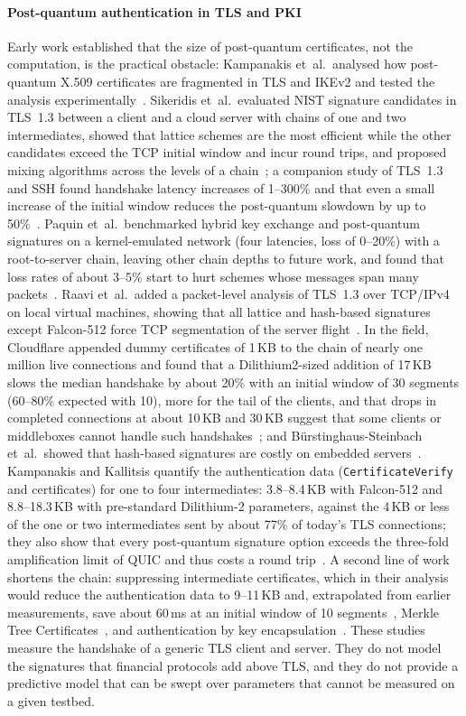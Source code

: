 \documentclass[preprint,12pt]{elsarticle}
\newcommand{\ms}{\,ms\xspace}
\newcommand{\KB}{\,KB\xspace}
\begin{document}
\paragraph{Post-quantum authentication in TLS and PKI} Early work established that the size of post-quantum certificates, not the computation, is the practical obstacle: Kampanakis et~al.\ analysed how post-quantum X.509 certificates are fragmented in TLS and IKEv2 and tested the analysis experimentally~\cite{kampanakis2018}. Sikeridis et~al.\ evaluated NIST signature candidates in TLS~1.3 between a client and a cloud server with chains of one and two intermediates, showed that lattice schemes are the most efficient while the other candidates exceed the TCP initial window and incur round trips, and proposed mixing algorithms across the levels of a chain~\cite{sikeridis2020}; a companion study of TLS~1.3 and SSH found handshake latency increases of 1--300\% and that even a small increase of the initial window reduces the post-quantum slowdown by up to 50\%~\cite{sikeridis2020b}. Paquin et~al.\ benchmarked hybrid key exchange and post-quantum signatures on a kernel-emulated network (four latencies, loss of 0--20\%) with a root-to-server chain, leaving other chain depths to future work, and found that loss rates of about 3--5\% start to hurt schemes whose messages span many packets~\cite{paquin2020}. Raavi et~al.\ added a packet-level analysis of TLS~1.3 over TCP/IPv4 on local virtual machines, showing that all lattice and hash-based signatures except Falcon-512 force TCP segmentation of the server flight~\cite{raavi2025}. In the field, Cloudflare appended dummy certificates of 1\KB to the chain of nearly one million live connections and found that a Dilithium2-sized addition of 17\KB slows the median handshake by about 20\% with an initial window of 30 segments (60--80\% expected with 10), more for the tail of the clients, and that drops in completed connections at about 10\KB and 30\KB suggest that some clients or middleboxes cannot handle such handshakes~\cite{westerbaan2021}; and Bürstinghaus-Steinbach et~al.\ showed that hash-based signatures are costly on embedded servers~\cite{burstinghaus2020}. Kampanakis and Kallitsis quantify the authentication data (\texttt{CertificateVerify} and certificates) for one to four intermediates: 3.8--8.4\KB with Falcon-512 and 8.8--18.3\KB with pre-standard Dilithium-2 parameters, against the 4\KB or less of the one or two intermediates sent by about 77\% of today's TLS connections; they also show that every post-quantum signature option exceeds the three-fold amplification limit of QUIC and thus costs a round trip~\cite{kampanakis2022}. A second line of work shortens the chain: suppressing intermediate certificates, which in their analysis would reduce the authentication data to 9--11\KB and, extrapolated from earlier measurements, save about 60\ms at an initial window of 10 segments~\cite{kampanakis2022}, Merkle Tree Certificates~\cite{mtcdraft}, and authentication by key encapsulation~\cite{schwabe2020}. These studies measure the handshake of a generic TLS client and server. They do not model the signatures that financial protocols add above TLS, and they do not provide a predictive model that can be swept over parameters that cannot be measured on a given testbed.
\end{document}
